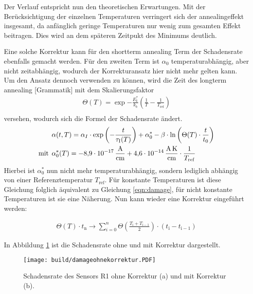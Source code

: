 Der Verlauf entspricht nun den theoretischen Erwartungen. Mit der Berücksichtigung
der einzelnen Temperaturen verringert sich der annealingeffekt insgesamt, da anfänglich
geringe Temperaturen nur wenig zum gesamten Effekt beitragen. Dies wird
an dem späteren Zeitpukt des Minimums deutlich.

Eine solche Korrektur kann für den shortterm annealing Term der Schadensrate ebenfalls gemacht werden.
Für den zweiten Term ist $\alpha_{0}$ temperaturabhängig, aber nicht zeitabhängig,
wodurch der Korrekturansatz hier nicht mehr gelten kann. Um den Ansatz dennoch
verwenden zu können, wird die Zeit des longterm annealing [Grammatik] mit dem
Skalierungsfaktor
\begin{align}
  \Theta(T) =  \exp{-\frac{E_{\mathrm{I}}^*}{k_b}\left(\frac{1}{T}-\frac{1}{T_{\mathrm{ref}}}\right)} \\
\end{align}
versehen, wodurch sich die Formel der Schadensrate ändert.
\begin{align}
  &\alpha(t, T) = \alpha_I \cdot \exp{\left(-\frac{t}{\tau_{\mathrm{I}}(T)}\right)} + \alpha_{\mathrm{0}}^{*} -\beta \cdot \ln{\left(\Theta(T) \cdot \frac{t}{t_{\mathrm{0}}}\right)} \\
  \medskip
  \text{mit}\:\: &\alpha^*_{\mathrm{0}}(T) = \SI{-8.9e-17}{\ampere\per\centi\meter} + \SI{4.6e-14}{\ampere\kelvin\per\centi\meter} \cdot \frac{1}{T_{\mathrm{ref}}}
\end{align}
Hierbei ist $\alpha^*_{0}$ nun nicht mehr temperaturabhängig,
sondern lediglich abhängig von einer Referenztemperatur $T_{\mathrm{ref}}$. Für konstante Temperaturen
ist diese Gleichung folglich äquivalent zu Gleichung \ref{eqn:damage}, für nicht
konstante Temperaturen ist sie eine Näherung.
Nun kann wieder eine Korrektur eingeführt werden:

\begin{align}
  \Theta(T) \cdot t_{\mathrm{n}} \rightarrow \sum_{i=0}^n   \Theta \left(\frac{T_{\mathrm{i}} +T_{\mathrm{i-1}}}{2}\right) \cdot  (t_{\mathrm{i}} - t_{\mathrm{i-1}})
\end{align}

In Abbildung \ref{fig:korrektur_damage} ist die Schadensrate ohne und mit Korrektur
dargestellt.

\begin{figure}
    \texttt{[image: build/damageohnekorrektur.PDF]}
\caption{Schadensrate des Sensors R1 ohne Korrektur (a) und mit Korrektur (b).}
\label{fig:korrektur_damage}
\end{figure}


